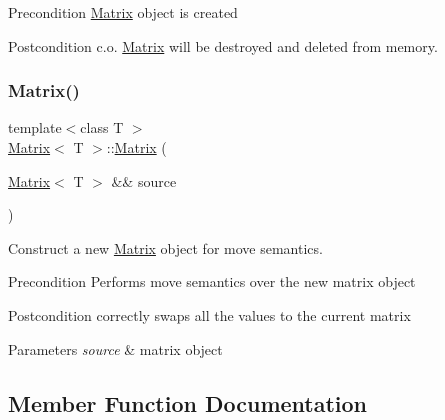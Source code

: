 \begin{DoxyPrecond}{Precondition}
\mbox{\hyperlink{class_matrix}{Matrix}} object is created 
\end{DoxyPrecond}
\begin{DoxyPostcond}{Postcondition}
c.\+o. \mbox{\hyperlink{class_matrix}{Matrix}} will be destroyed and deleted from memory. 
\end{DoxyPostcond}
\mbox{\label{class_matrix_a0632d6b00522f3ce31684c07cb258440}} 
\subsubsection{\texorpdfstring{Matrix()}{Matrix()}\hspace{0.1cm}{\footnotesize\ttfamily [4/4]}}
{\footnotesize\ttfamily template$<$class T $>$ \\
\mbox{\hyperlink{class_matrix}{Matrix}}$<$ T $>$\+::\mbox{\hyperlink{class_matrix}{Matrix}} (\begin{DoxyParamCaption}\item[{\mbox{\hyperlink{class_matrix}{Matrix}}$<$ T $>$ \&\&}]{source }\end{DoxyParamCaption})}



Construct a new \mbox{\hyperlink{class_matrix}{Matrix}} object for move semantics. 

\begin{DoxyPrecond}{Precondition}
Performs move semantics over the new matrix object 
\end{DoxyPrecond}
\begin{DoxyPostcond}{Postcondition}
correctly swaps all the values to the current matrix 
\end{DoxyPostcond}

\begin{DoxyParams}{Parameters}
{\em source} & matrix object \\
\hline
\end{DoxyParams}


\subsection{Member Function Documentation}
\mbox{\label{class_matrix_a19ee57616bae9c683f2c9e6756cba29e}} 
